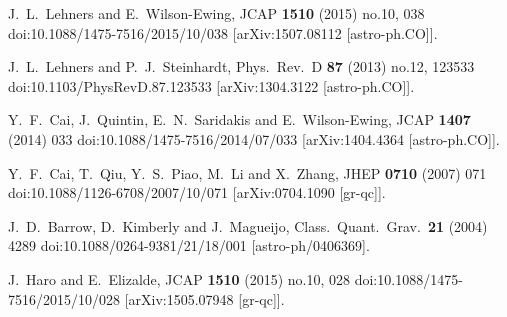 \documentclass{article}
\begin{document}
\begin{thebibliography}{99}
J.~L.~Lehners and E.~Wilson-Ewing,
JCAP {\bf 1510} (2015) no.10, 038
doi:10.1088/1475-7516/2015/10/038
[arXiv:1507.08112 [astro-ph.CO]].






J.~L.~Lehners and P.~J.~Steinhardt,
Phys.\ Rev.\ D {\bf 87} (2013) no.12, 123533
doi:10.1103/PhysRevD.87.123533
[arXiv:1304.3122 [astro-ph.CO]].




Y.~F.~Cai, J.~Quintin, E.~N.~Saridakis and E.~Wilson-Ewing,
JCAP {\bf 1407} (2014) 033
doi:10.1088/1475-7516/2014/07/033
[arXiv:1404.4364 [astro-ph.CO]].




Y.~F.~Cai, T.~Qiu, Y.~S.~Piao, M.~Li and X.~Zhang,
JHEP {\bf 0710} (2007) 071
doi:10.1088/1126-6708/2007/10/071
[arXiv:0704.1090 [gr-qc]].







J.~D.~Barrow, D.~Kimberly and J.~Magueijo,
Class.\ Quant.\ Grav.\ {\bf 21} (2004) 4289
doi:10.1088/0264-9381/21/18/001
[astro-ph/0406369].

J.~Haro and E.~Elizalde,
JCAP {\bf 1510} (2015) no.10, 028
doi:10.1088/1475-7516/2015/10/028
[arXiv:1505.07948 [gr-qc]].





\end{thebibliography}
\end{document}
